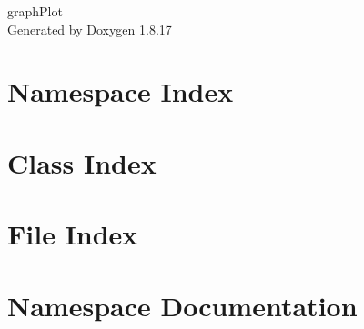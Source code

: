 \let\mypdfximage\pdfximage\def\pdfximage{\immediate\mypdfximage}\documentclass[twoside]{book}
\newcommand{\+}{\discretionary{\mbox{\scriptsize$\hookleftarrow$}}{}{}}
\newcommand{\clearemptydoublepage}{%
  \newpage{\pagestyle{empty}\cleardoublepage}%
}
\begin{document}
\hypersetup{pageanchor=false,
             bookmarksnumbered=true,
             pdfencoding=unicode
            }
\begin{titlepage}
\vspace*{7cm}
\begin{center}%
{\Large graph\+Plot }\\
\vspace*{1cm}
{\large Generated by Doxygen 1.8.17}\\
\end{center}
\end{titlepage}
\clearemptydoublepage
{}
\tableofcontents
\clearemptydoublepage
{}
\hypersetup{pageanchor=true}

\chapter{Namespace Index}

\chapter{Class Index}

\chapter{File Index}

\chapter{Namespace Documentation}






























\end{document}
